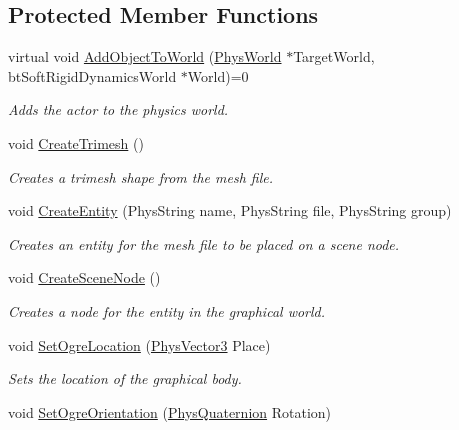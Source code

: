 \subsection*{Protected Member Functions}
\begin{DoxyCompactItemize}
\item 
virtual void \hyperlink{classActorBase_a1af82a2ed960fd114518fdf84d5ff146}{AddObjectToWorld} (\hyperlink{classPhysWorld}{PhysWorld} $\ast$TargetWorld, btSoftRigidDynamicsWorld $\ast$World)=0
\begin{DoxyCompactList}\small\item\em Adds the actor to the physics world. \item\end{DoxyCompactList}\item 
void \hyperlink{classActorBase_af7f0806222c79b5d5120dccefd93715e}{CreateTrimesh} ()
\begin{DoxyCompactList}\small\item\em Creates a trimesh shape from the mesh file. \item\end{DoxyCompactList}\item 
void \hyperlink{classActorBase_aa87583c47b8653e8ac7d96f1481b57fd}{CreateEntity} (PhysString name, PhysString file, PhysString group)
\begin{DoxyCompactList}\small\item\em Creates an entity for the mesh file to be placed on a scene node. \item\end{DoxyCompactList}\item 
void \hyperlink{classActorBase_a168cd57e20b2adfc5cae21627ddbae31}{CreateSceneNode} ()
\begin{DoxyCompactList}\small\item\em Creates a node for the entity in the graphical world. \item\end{DoxyCompactList}\item 
void \hyperlink{classActorBase_a3140cc5c1c630efc1c04c20ada319b8b}{SetOgreLocation} (\hyperlink{classPhysVector3}{PhysVector3} Place)
\begin{DoxyCompactList}\small\item\em Sets the location of the graphical body. \item\end{DoxyCompactList}\item 
void \hyperlink{classActorBase_a55f45703e3d9b8de0cd07b23bd9460bf}{SetOgreOrientation} (\hyperlink{classPhysQuaternion}{PhysQuaternion} Rotation)

\end{DoxyCompactItemize}
